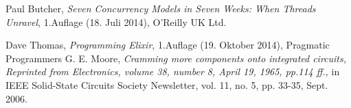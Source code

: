 \documentclass[10pt,journal,compsoc]{IEEEtran}
\begin{document}
%
%







%
%
%
\begin{thebibliography}{1}

  Paul Butcher, \emph{Seven Concurrency Models in Seven Weeks: When Threads Unravel}, 1.Auflage (18. Juli 2014), O'Reilly UK Ltd.

  Dave Thomas, \emph{Programming Elixir}, 1.Auflage (19. Oktober 2014), Pragmatic Programmers
  G. E. Moore, \emph{Cramming more components onto integrated circuits, Reprinted from Electronics, volume 38, number 8, April 19, 1965, pp.114 ff.,} in IEEE Solid-State Circuits Society Newsletter, vol. 11, no. 5, pp. 33-35, Sept. 2006.
\end{thebibliography}
\end{document}
